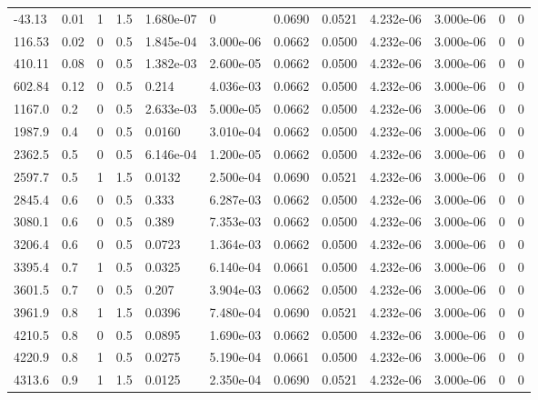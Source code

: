 \documentclass[preview]{standalone}
\begin{document}
{{\begin{tabular}{L{1.2cm}C{1.2cm} C{0.3cm}C{0.5cm} C{1.4cm}C{1.4cm} C{1.4cm}C{1.4cm} C{1.6cm}C{1.6cm} C{1.6cm}C{1.6cm}}
  -43.13  &  0.01  & 1     & 1.5 &  1.680e-07  & 0  &  0.0690&   0.0521& 4.232e-06 & 3.000e-06   &  0 & 0  \\ 
  116.53  &  0.02  & 0     & 0.5 &  1.845e-04  & 3.000e-06  &  0.0662&   0.0500& 4.232e-06 & 3.000e-06   &  0 & 0  \\ 
  410.11  &  0.08  & 0     & 0.5 &  1.382e-03  & 2.600e-05  &  0.0662&   0.0500& 4.232e-06 & 3.000e-06   &  0 & 0  \\ 
  602.84  &  0.12  & 0     & 0.5 &  0.214  & 4.036e-03  &  0.0662&   0.0500& 4.232e-06 & 3.000e-06   &  0 & 0  \\ 
  1167.0  &   0.2  & 0     & 0.5 &  2.633e-03  & 5.000e-05  &  0.0662&   0.0500& 4.232e-06 & 3.000e-06   &  0 & 0  \\ 
  1987.9  &   0.4  & 0     & 0.5 &  0.0160  & 3.010e-04  &  0.0662&   0.0500& 4.232e-06 & 3.000e-06   &  0 & 0  \\ 
  2362.5  &   0.5  & 0     & 0.5 &  6.146e-04  & 1.200e-05  &  0.0662&   0.0500& 4.232e-06 & 3.000e-06   &  0 & 0  \\ 
  2597.7  &   0.5  & 1     & 1.5 &  0.0132  & 2.500e-04  &  0.0690&   0.0521& 4.232e-06 & 3.000e-06   &  0 & 0  \\ 
  2845.4  &   0.6  & 0     & 0.5 &  0.333  & 6.287e-03  &  0.0662&   0.0500& 4.232e-06 & 3.000e-06   &  0 & 0  \\ 
  3080.1  &   0.6  & 0     & 0.5 &  0.389  & 7.353e-03  &  0.0662&   0.0500& 4.232e-06 & 3.000e-06   &  0 & 0  \\ 
  3206.4  &   0.6  & 0     & 0.5 &  0.0723  & 1.364e-03  &  0.0662&   0.0500& 4.232e-06 & 3.000e-06   &  0 & 0  \\ 
  3395.4  &   0.7  & 1     & 0.5 &  0.0325  & 6.140e-04  &  0.0661&   0.0500& 4.232e-06 & 3.000e-06   &  0 & 0  \\ 
  3601.5  &   0.7  & 0     & 0.5 &  0.207  & 3.904e-03  &  0.0662&   0.0500& 4.232e-06 & 3.000e-06   &  0 & 0  \\ 
  3961.9  &   0.8  & 1     & 1.5 &  0.0396  & 7.480e-04  &  0.0690&   0.0521& 4.232e-06 & 3.000e-06   &  0 & 0  \\ 
  4210.5  &   0.8  & 0     & 0.5 &  0.0895  & 1.690e-03  &  0.0662&   0.0500& 4.232e-06 & 3.000e-06   &  0 & 0  \\ 
  4220.9  &   0.8  & 1     & 0.5 &  0.0275  & 5.190e-04  &  0.0661&   0.0500& 4.232e-06 & 3.000e-06   &  0 & 0  \\ 
  4313.6  &   0.9  & 1     & 1.5 &  0.0125  & 2.350e-04  &  0.0690&   0.0521& 4.232e-06 & 3.000e-06   &  0 & 0  \\ 

\end{tabular}}}
\end{document}
